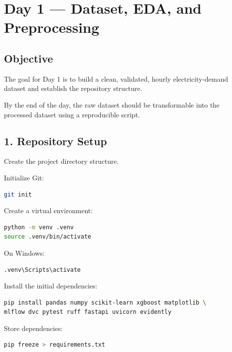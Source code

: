 \documentclass[11pt,a4paper]{article}
\begin{document}
\newpage


\section{Day 1 --- Dataset, EDA, and Preprocessing}

\subsection{Objective}

The goal for Day 1 is to build a clean, validated, hourly electricity-demand dataset and establish the repository structure.

By the end of the day, the raw dataset should be transformable into the processed dataset using a reproducible script.

\subsection{1. Repository Setup}

Create the project directory structure.

Initialize Git:

\begin{lstlisting}[language=bash]
git init
\end{lstlisting}

Create a virtual environment:

\begin{lstlisting}[language=bash]
python -m venv .venv
source .venv/bin/activate
\end{lstlisting}

On Windows:

\begin{lstlisting}[language=bash]
.venv\Scripts\activate
\end{lstlisting}

Install the initial dependencies:

\begin{lstlisting}[language=bash]
pip install pandas numpy scikit-learn xgboost matplotlib \
mlflow dvc pytest ruff fastapi uvicorn evidently
\end{lstlisting}

Store dependencies:

\begin{lstlisting}[language=bash]
pip freeze > requirements.txt
\end{lstlisting}
\end{document}
